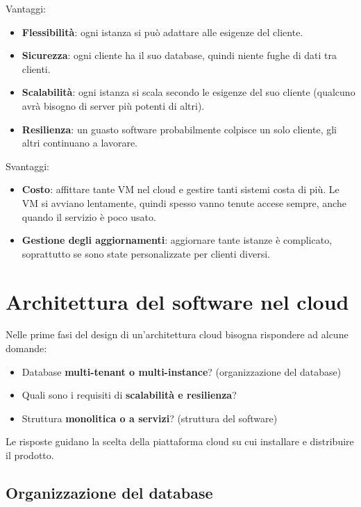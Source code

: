Vantaggi:

\begin{itemize}
\tightlist
\item
  \textbf{Flessibilità}: ogni istanza si può adattare alle esigenze del
  cliente.
\item
  \textbf{Sicurezza}: ogni cliente ha il suo database, quindi niente
  fughe di dati tra clienti.
\item
  \textbf{Scalabilità}: ogni istanza si scala secondo le esigenze del
  suo cliente (qualcuno avrà bisogno di server più potenti di altri).
\item
  \textbf{Resilienza}: un guasto software probabilmente colpisce un solo
  cliente, gli altri continuano a lavorare.
\end{itemize}

Svantaggi:

\begin{itemize}
\tightlist
\item
  \textbf{Costo}: affittare tante VM nel cloud e gestire tanti sistemi
  costa di più. Le VM si avviano lentamente, quindi spesso vanno tenute
  accese sempre, anche quando il servizio è poco usato.
\item
  \textbf{Gestione degli aggiornamenti}: aggiornare tante istanze è
  complicato, soprattutto se sono state personalizzate per clienti
  diversi.
\end{itemize}

\section{Architettura del software nel
cloud}\label{architettura-del-software-nel-cloud}

Nelle prime fasi del design di un'architettura cloud bisogna rispondere
ad alcune domande:

\begin{itemize}
\tightlist
\item
  Database \textbf{multi-tenant o multi-instance}? (organizzazione del
  database)
\item
  Quali sono i requisiti di \textbf{scalabilità e resilienza}?
\item
  Struttura \textbf{monolitica o a servizi}? (struttura del software)
\end{itemize}

Le risposte guidano la scelta della piattaforma cloud su cui installare
e distribuire il prodotto.

\subsection{Organizzazione del
database}\label{organizzazione-del-database}

